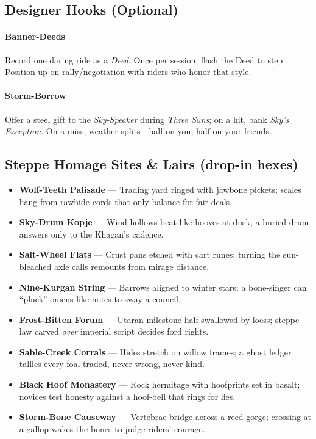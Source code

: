 \subsection*{Designer Hooks (Optional)}

\paragraph{Banner-Deeds}
Record one daring ride as a \emph{Deed}. Once per session, flash the Deed to step Position up on rally/negotiation with riders who honor that style.

\paragraph{Storm-Borrow}
Offer a steel gift to the \emph{Sky-Speaker} during \emph{Three Suns}; on a hit, bank \emph{Sky’s Exception}. On a miss, weather splits—half on you, half on your friends.

\subsection*{Steppe Homage Sites \& Lairs (drop-in hexes)}
\begin{itemize}
  \item \textbf{Wolf-Teeth Palisade} — Trading yard ringed with jawbone pickets; scales hang from rawhide cords that only balance for fair deals.
  \item \textbf{Sky-Drum Kopje} — Wind hollows beat like hooves at dusk; a buried drum answers only to the Khagan’s cadence.
  \item \textbf{Salt-Wheel Flats} — Crust pans etched with cart runes; turning the sun-bleached axle calls remounts from mirage distance.
  \item \textbf{Nine-Kurgan String} — Barrows aligned to winter stars; a bone-singer can “pluck” omens like notes to sway a council.
  \item \textbf{Frost-Bitten Forum} — Utaran milestone half-swallowed by loess; steppe law carved \emph{over} imperial script decides ford rights.
  \item \textbf{Sable-Creek Corrals} — Hides stretch on willow frames; a ghost ledger tallies every foal traded, never wrong, never kind.
  \item \textbf{Black Hoof Monastery} — Rock hermitage with hoofprints set in basalt; novices test honesty against a hoof-bell that rings for lies.
  \item \textbf{Storm-Bone Causeway} — Vertebrae bridge across a reed-gorge; crossing at a gallop wakes the bones to judge riders’ courage.
\end{itemize}

